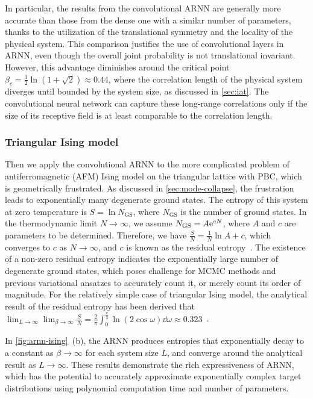 In particular, the results from the convolutional ARNN are generally more accurate than those from the dense one with a similar number of parameters, thanks to the utilization of the translational symmetry and the locality of the physical system. This comparison justifies the use of convolutional layers in ARNN, even though the overall joint probability is not translational invariant. However, this advantage diminishes around the critical point $\beta_c = \frac{1}{2} \ln(1 + \sqrt{2}) \approx 0.44$, where the correlation length of the physical system diverges until bounded by the system size, as discussed in \cref{sec:iat}. The convolutional neural network can capture these long-range correlations only if the size of its receptive field is at least comparable to the correlation length.

\subsubsection{Triangular Ising model}

Then we apply the convolutional ARNN to the more complicated problem of antiferromagnetic (AFM) Ising model on the triangular lattice with PBC, which is geometrically frustrated. As discussed in \cref{sec:mode-collapse}, the frustration leads to exponentially many degenerate ground states. The entropy of this system at zero temperature is $S = \ln N_\text{GS}$, where $N_\text{GS}$ is the number of ground states. In the thermodynamic limit $N \to \infty$, we assume $N_\text{GS} = A \mathrm{e}^{c N}$, where $A$ and $c$ are parameters to be determined. Therefore, we have $\frac{S}{N} = \frac{1}{N} \ln A + c$, which converges to $c$ as $N \to \infty$, and $c$ is known as the residual entropy~\cite{wannier1950antiferromagnetism, mambrini1999residual, vanderstraeten2018residual}. The existence of a non-zero residual entropy indicates the exponentially large number of degenerate ground states, which poses challenge for MCMC methods and previous variational ansatzes to accurately count it, or merely count its order of magnitude. For the relatively simple case of triangular Ising model, the analytical result of the residual entropy has been derived that $\lim_{L \to \infty} \lim_{\beta \to \infty} \frac{S}{N} = \frac{2}{\pi} \int_0^{\frac{\pi}{3}} \ln(2 \cos \omega) \dd \omega \approx 0.323$~\cite{wannier1950antiferromagnetism, wannier1973antiferromagnetism}.

In \cref{fig:arnn-ising}~(b), the ARNN produces entropies that exponentially decay to a constant as $\beta \to \infty$ for each system size $L$, and converge around the analytical result as $L \to \infty$. These results demonstrate the rich expressiveness of ARNN, which has the potential to accurately approximate exponentially complex target distributions using polynomial computation time and number of parameters.

